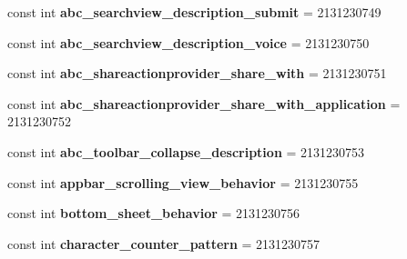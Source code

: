 \begin{DoxyCompactItemize}
\item 
\mbox{\label{class_sample_app_1_1_droid_1_1_resource_1_1_string_a1092a6b4d3a1c731724e07b89f3cea96}} 
const int {\bfseries abc\+\_\+searchview\+\_\+description\+\_\+submit} = 2131230749
\item 
\mbox{\label{class_sample_app_1_1_droid_1_1_resource_1_1_string_ab76a1277b3e3b280f1fc033e76f19830}} 
const int {\bfseries abc\+\_\+searchview\+\_\+description\+\_\+voice} = 2131230750
\item 
\mbox{\label{class_sample_app_1_1_droid_1_1_resource_1_1_string_a7abd7ba8e1bfd942d0acfc73fbdb7cb2}} 
const int {\bfseries abc\+\_\+shareactionprovider\+\_\+share\+\_\+with} = 2131230751
\item 
\mbox{\label{class_sample_app_1_1_droid_1_1_resource_1_1_string_ae0c448d1655a094dbf41b26e9297d933}} 
const int {\bfseries abc\+\_\+shareactionprovider\+\_\+share\+\_\+with\+\_\+application} = 2131230752
\item 
\mbox{\label{class_sample_app_1_1_droid_1_1_resource_1_1_string_a76c7e87279cb4e364f015ef026b43bd6}} 
const int {\bfseries abc\+\_\+toolbar\+\_\+collapse\+\_\+description} = 2131230753
\item 
\mbox{\label{class_sample_app_1_1_droid_1_1_resource_1_1_string_a80bfde466c08ccea3a1ca679865e9efd}} 
const int {\bfseries appbar\+\_\+scrolling\+\_\+view\+\_\+behavior} = 2131230755
\item 
\mbox{\label{class_sample_app_1_1_droid_1_1_resource_1_1_string_a04fbd67e4f0d1513826580a3850881e6}} 
const int {\bfseries bottom\+\_\+sheet\+\_\+behavior} = 2131230756
\item 
\mbox{\label{class_sample_app_1_1_droid_1_1_resource_1_1_string_a0328854c036121d9b14156f84c3d1d79}} 
const int {\bfseries character\+\_\+counter\+\_\+pattern} = 2131230757

\end{DoxyCompactItemize}
